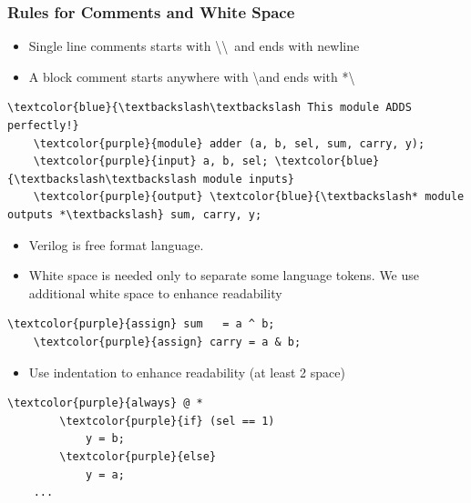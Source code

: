\documentclass[t, notes]{beamer}
\begin{document}
\begin{frame}[fragile]
\frametitle{Rules for Comments and White Space}

\begin{itemize}
\item Single line comments starts with \textbackslash\textbackslash \ and ends with newline
\item A block comment starts anywhere with \textbackslash * and ends with *\textbackslash 
\end{itemize}
{\footnotesize%
\begin{Verbatim}[commandchars=\\\{\}, tabsize=2]
	\textcolor{blue}{\textbackslash\textbackslash This module ADDS perfectly!}
	\textcolor{purple}{module} adder (a, b, sel, sum, carry, y);
	\textcolor{purple}{input} a, b, sel; \textcolor{blue}{\textbackslash\textbackslash module inputs}
	\textcolor{purple}{output} \textcolor{blue}{\textbackslash* module outputs *\textbackslash} sum, carry, y;
\end{Verbatim}
}

\begin{itemize}
\item Verilog is free format language.
\item White space is needed only to separate some language tokens. We use additional white space to enhance readability
\end{itemize}

{\footnotesize%
\begin{Verbatim}[commandchars=\\\{\}, tabsize=2]
	\textcolor{purple}{assign} sum   = a ^ b;
	\textcolor{purple}{assign} carry = a & b;
\end{Verbatim}
}

\begin{itemize}
\item Use indentation to enhance readability (at least 2 space)
\end{itemize}

{\footnotesize%
\begin{Verbatim}[commandchars=\\\{\}, tabsize=2]
	\textcolor{purple}{always} @ *
		\textcolor{purple}{if} (sel == 1)
			y = b;
		\textcolor{purple}{else}
			y = a;
	...
\end{Verbatim}
}

\end{frame}
\end{document}
